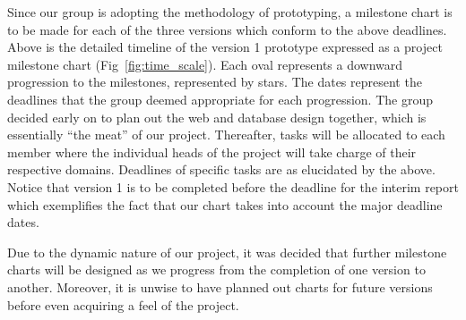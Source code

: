 Since our group is adopting the methodology of prototyping, a milestone chart is to be made for each of the three versions which conform to the above deadlines. Above is the detailed timeline of the version 1 prototype expressed as a project milestone chart (Fig~\ref{fig:time_scale}).
Each oval represents a downward progression to the milestones, represented by stars. The dates represent the deadlines that the group deemed appropriate for each progression. The group decided early on to plan out the web and database design together, which is essentially “the meat” of our project. Thereafter, tasks will be allocated to each member where the individual heads of the project will take charge of their respective domains. Deadlines of specific tasks are as elucidated by the above. Notice that version 1 is to be completed before the deadline for the interim report which exemplifies the fact that our chart takes into account the major deadline dates.

Due to the dynamic nature of our project, it was decided that further milestone charts will be designed as we progress from the completion of one version to another. Moreover, it is unwise to have planned out charts for future versions before even acquiring a feel of the project.
\newpage

 
